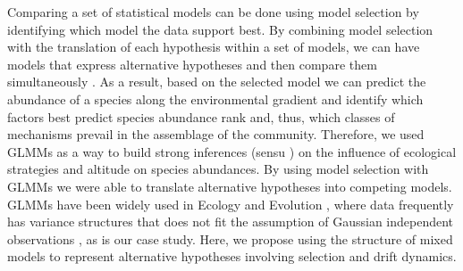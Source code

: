 \documentclass[12pt]{article}
\begin{document}
Comparing a set of statistical models can be done using model
selection by identifying which model the data support best. By
combining model selection with the translation of each hypothesis
within a set of models, we can have models that express alternative
hypotheses and then compare them simultaneously \citep{Johnson2004,Burham2002}.
As a result, based on the selected model we can predict the abundance
of a species along the environmental gradient and identify which
factors best predict species abundance rank and, thus, which classes of
mechanisms prevail in the assemblage of the community.  Therefore, we
used GLMMs as a way to build strong inferences (sensu
\cite{Mcgill2003}) on the influence of ecological strategies and
altitude on species abundances.  By using model selection with GLMMs
we were able to translate alternative hypotheses into competing
models. GLMMs have been widely used in Ecology and Evolution
, where data frequently has variance structures that does not fit the
assumption of Gaussian independent observations \citep{Bolker2009}, as
is our case study. Here, we %
propose using the structure of mixed models to represent alternative
hypotheses involving selection and drift dynamics.
\end{document}
